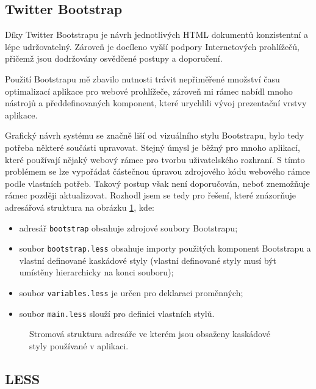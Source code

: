 \subsection{Twitter Bootstrap}

Díky Twitter Bootstrapu je návrh jednotlivých HTML dokumentů konzistentní a lépe udržovatelný. Zároveň je docíleno vyšší podpory Internetových prohlížečů, přičemž jsou dodržovány osvědčené postupy a doporučení.

Použití Bootstrapu mě zbavilo nutnosti trávit nepřiměřené množství času optimalizací aplikace pro webové prohlížeče, zároveň mi rámec nabídl mnoho nástrojů a předdefinovaných komponent, které urychlili vývoj prezentační vrstvy aplikace.

Grafický návrh systému se značně liší od vizuálního stylu Bootstrapu, bylo tedy potřeba některé součásti upravovat. Stejný úmysl je běžný pro mnoho aplikací, které používají nějaký webový rámec pro tvorbu uživatelského rozhraní. S tímto problémem se lze vypořádat částečnou úpravou zdrojového kódu webového rámce podle vlastních potřeb. Takový postup však není doporučován, neboť znemožňuje rámec později aktualizovat. Rozhodl jsem se tedy pro řešení, které znázorňuje adresářová struktura na obrázku \ref{fig:tree}, kde:

\begin{itemize}
    \item adresář \texttt{bootstrap} obsahuje zdrojové soubory Bootstrapu;
    \item soubor \texttt{bootstrap.less} obsahuje importy použitých komponent Bootstrapu a vlastní definované kaskádové styly (vlastní definované styly musí být umístěny hierarchicky na konci souboru);
    \item soubor \texttt{variables.less} je určen pro deklaraci proměnných;
    \item soubor \texttt{main.less} slouží pro definici vlastních stylů.
\end{itemize}

\begin{figure}
    \caption{Stromová struktura adresáře ve kterém jsou obsaženy kaskádové styly používané v aplikaci.}
    \label{fig:tree}
\end{figure}

\subsection{LESS}


